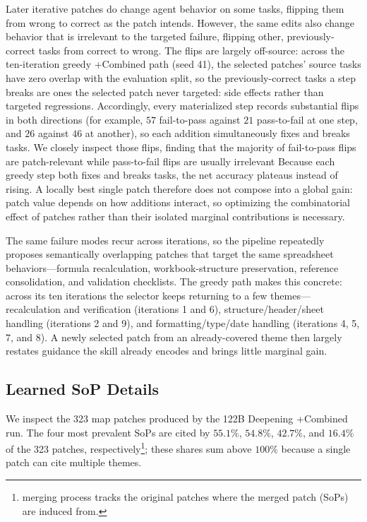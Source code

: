 Later iterative patches do change agent behavior on some tasks, flipping them from wrong to correct as the patch intends.
However, the same edits also change behavior that is irrelevant to the targeted failure, flipping other, previously-correct tasks from correct to wrong.
The flips are largely off-source: across the ten-iteration greedy +Combined path (seed 41), the selected patches' source tasks have zero overlap with the evaluation split, so the previously-correct tasks a step breaks are ones the selected patch never targeted: side effects rather than targeted regressions.
Accordingly, every materialized step records substantial flips in both directions (for example, $57$ fail-to-pass against $21$ pass-to-fail at one step, and $26$ against $46$ at another), so each addition simultaneously fixes and breaks tasks. We closely inspect those flips, finding that the majority of fail-to-pass flips are patch-relevant while pass-to-fail flips are usually irrelevant
Because each greedy step both fixes and breaks tasks, the net accuracy plateaus instead of rising.
A locally best single patch therefore does not compose into a global gain: patch value depends on how additions interact, so optimizing the combinatorial effect of patches rather than their isolated marginal contributions is necessary.

The same failure modes recur across iterations, so the pipeline repeatedly proposes semantically overlapping patches that target the same spreadsheet behaviors---formula recalculation, workbook-structure preservation, reference consolidation, and validation checklists.
The greedy path makes this concrete: across its ten iterations the selector keeps returning to a few themes---recalculation and verification (iterations 1 and 6), structure/header/sheet handling (iterations 2 and 9), and formatting/type/date handling (iterations 4, 5, 7, and 8).
A newly selected patch from an already-covered theme then largely restates guidance the skill already encodes and brings little marginal gain.

\subsection{Learned SoP Details}
\label{app:sops}
\label{app:sops_secondary}

We inspect the 323 map patches produced by the 122B Deepening +Combined run.
The four most prevalent SoPs are cited by $55.1\%$, $54.8\%$, $42.7\%$, and $16.4\%$ of the 323 patches, respectively\footnote{\systemname{} merging process tracks the original patches where the merged patch (SoPs) are induced from.}; these shares sum above $100\%$ because a single patch can cite multiple themes.

